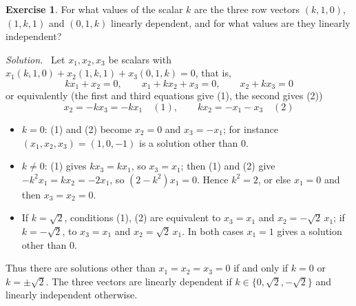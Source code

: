 \documentclass[12pt]{article}
\theoremstyle{definition}
\newtheorem{exercise}{Exercise}
\newenvironment{solution}{\par\noindent\textit{Solution.}\ }{\par\smallskip}
\begin{document}
\begin{exercise}\label{r3-ex-dependent-k}
For what values of the scalar \(k\) are the three row vectors \((k,1,0)\), \((1,k,1)\) and
\((0,1,k)\) linearly dependent, and for what values are they linearly independent?
\end{exercise}
\begin{solution}
Let \(x_1,x_2,x_3\) be scalars with \(x_1(k,1,0)+x_2(1,k,1)+x_3(0,1,k)=0\), that is,
\[
kx_1+x_2=0,\qquad x_1+kx_2+x_3=0,\qquad x_2+kx_3=0
\]
or equivalently (the first and third equations give (1), the second gives (2))
\[
x_2=-kx_3=-kx_1\quad(1),\qquad kx_2=-x_1-x_3\quad(2)
\]
\begin{itemize}
\item \(k=0\): (1) and (2) become \(x_2=0\) and \(x_3=-x_1\); for instance
\((x_1,x_2,x_3)=(1,0,-1)\) is a solution other than \(0\).
\item \(k\ne0\): (1) gives \(kx_3=kx_1\), so \(x_3=x_1\); then (1) and (2) give
\(-k^2x_1=kx_2=-2x_1\), so \((2-k^2)x_1=0\). Hence \(k^2=2\), or else \(x_1=0\) and then
\(x_3=x_2=0\).
\item If \(k=\sqrt2\), conditions (1), (2) are equivalent to \(x_3=x_1\) and
\(x_2=-\sqrt2\,x_1\); if \(k=-\sqrt2\), to \(x_3=x_1\) and \(x_2=\sqrt2\,x_1\). In both cases
\(x_1=1\) gives a solution other than \(0\).
\end{itemize}
Thus there are solutions other than \(x_1=x_2=x_3=0\) if and only if \(k=0\) or
\(k=\pm\sqrt2\). The three vectors are linearly dependent if \(k\in\{0,\sqrt2,-\sqrt2\}\) and
linearly independent otherwise.
\end{solution}
\end{document}
